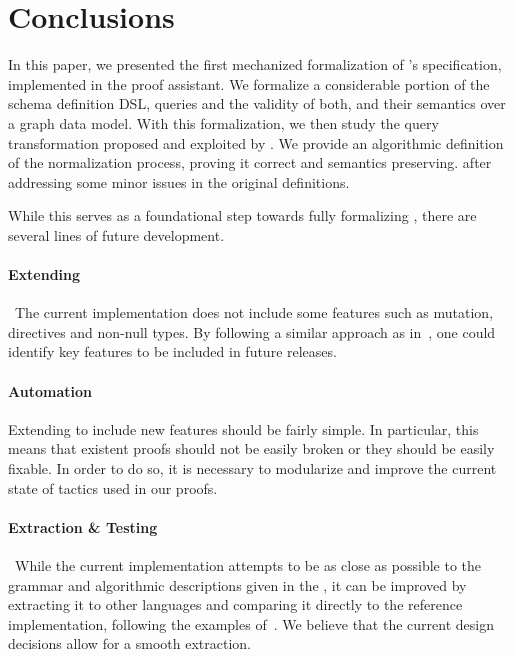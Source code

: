 \section{Conclusions}
\label{sec:conclusion}

In this paper, we presented the first mechanized formalization of \gql's specification, implemented in the \coq proof assistant.
We formalize a considerable portion of the schema definition DSL, queries and the validity of both, and their semantics over a graph data model. 
With this formalization, we then study the query transformation proposed and exploited by \HP. 
We provide an algorithmic definition of the normalization process, proving it correct and semantics preserving. after 
addressing some minor issues in the original definitions.

While this serves as a foundational step towards fully formalizing \gql, there are several lines of future development.
\paragraph{Extending \gcoql} The current implementation does not include some features such as mutation, directives and non-null types. 
By following a similar approach as in~\cite{empiricalgql}, one could identify key features to be included in future releases.

\paragraph{Automation} Extending \gcoql to include new features should be fairly simple. In particular, this means that existent proofs should 
not be easily broken or they should be easily fixable. In order to do so, it is necessary to modularize and improve the current state of tactics used in
our proofs.

\paragraph{Extraction \& Testing} While the current implementation attempts to be as close as possible to the grammar and algorithmic descriptions
given in the \spec, it can be improved by extracting it to other languages and comparing it directly to the reference implementation, following the examples of~\cite{jscert, coqr}.
We believe that the current design decisions allow for a smooth extraction.

